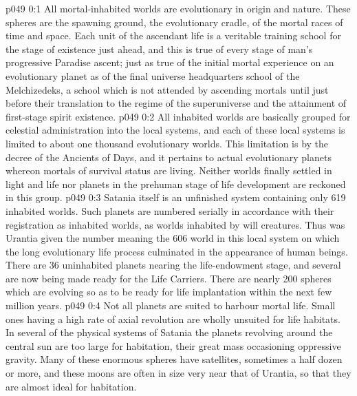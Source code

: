 \author{Melchizedek}
\vs p049 0:1 All mortal\hyp{}inhabited worlds are evolutionary in origin and nature. These spheres are the spawning ground, the evolutionary cradle, of the mortal races of time and space. Each unit of the ascendant life is a veritable training school for the stage of existence just ahead, and this is true of every stage of man’s progressive Paradise ascent; just as true of the initial mortal experience on an evolutionary planet as of the final universe headquarters school of the Melchizedeks, a school which is not attended by ascending mortals until just before their translation to the regime of the superuniverse and the attainment of first\hyp{}stage spirit existence.
\vs p049 0:2 \pc All inhabited worlds are basically grouped for celestial administration into the local systems, and each of these local systems is limited to about one thousand evolutionary worlds. This limitation is by the decree of the Ancients of Days, and it pertains to actual evolutionary planets whereon mortals of survival status are living. Neither worlds finally settled in light and life nor planets in the prehuman stage of life development are reckoned in this group.
\vs p049 0:3 \pc Satania itself is an unfinished system containing only 619 inhabited worlds. Such planets are numbered serially in accordance with their registration as inhabited worlds, as worlds inhabited by will creatures. Thus was Urantia given the number  meaning the 606 world in this local system on which the long evolutionary life process culminated in the appearance of human beings. There are 36 uninhabited planets nearing the life\hyp{}endowment stage, and several are now being made ready for the Life Carriers. There are nearly 200 spheres which are evolving so as to be ready for life implantation within the next few million years.
\vs p049 0:4 Not all planets are suited to harbour mortal life. Small ones having a high rate of axial revolution are wholly unsuited for life habitats. In several of the physical systems of Satania the planets revolving around the central sun are too large for habitation, their great mass occasioning oppressive gravity. Many of these enormous spheres have satellites, sometimes a half dozen or more, and these moons are often in size very near that of Urantia, so that they are almost ideal for habitation.
